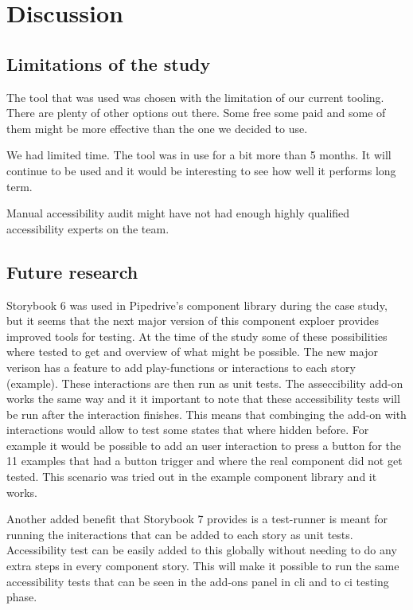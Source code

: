 \documentclass{master_thesis}
\begin{document}
\section{Discussion} \label{chap:conclusions}

\subsection{Limitations of the study}

The tool that was used was chosen with the limitation of our current tooling. There are plenty of other options out there. Some free some paid and some of them might be more effective than the one we decided to use.

We had limited time. The tool was in use for a bit more than 5 months. It will continue to be used and it would be interesting to see how well it performs long term.

Manual accessibility audit might have not had enough highly qualified accessibility experts on the team.

\subsection{Future research}

Storybook 6 was used in Pipedrive's component library during the case study, but it seems that the next major version of this component exploer provides improved tools for testing. At the time of the study some of these possibilities where tested to get and overview of what might be possible. The new major verison has a feature to add play-functions or interactions to each story (example). These interactions are then run as unit tests. The asseccibility add-on works the same way and it it important to note that these accessibility tests will be run after the interaction finishes. This means that combinging the add-on with interactions would allow to test some states that where hidden before. For example it would be possible to add an user interaction to press a button for the 11 examples that had a button trigger and where the real component did not get tested. This scenario was tried out in the example component library and it works.

Another added benefit that Storybook 7 provides is a test-runner is meant for running the initeractions that can be added to each story as unit tests. Accessibility test can be easily added to this globally without needing to do any extra steps in every component story. This will make it possible to run the same accessibility tests that can be seen in the add-ons panel in \ac{cli} and to \ac{ci} testing phase.

\end{document}
